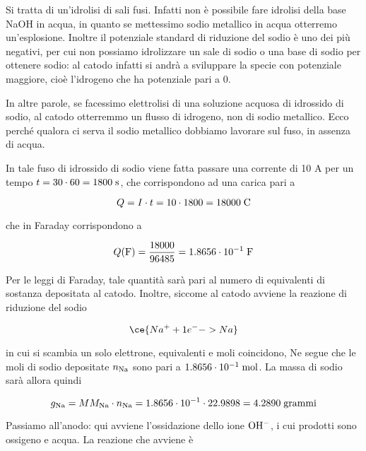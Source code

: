 \vspace{0.2cm}Si tratta di un'idrolisi di sali fusi. Infatti non è possibile fare idrolisi della base NaOH in acqua, in quanto se mettessimo sodio metallico in acqua otterremo un'esplosione. Inoltre il potenziale standard di riduzione del sodio è uno dei più negativi, per cui non possiamo idrolizzare un sale di sodio o una base di sodio per ottenere sodio: al catodo infatti si andrà a sviluppare la specie con potenziale maggiore, cioè l'idrogeno che ha potenziale pari a 0.

In altre parole, se facessimo elettrolisi di una soluzione acquosa di idrossido di sodio, al catodo otterremmo un flusso di idrogeno, non di sodio metallico. Ecco perché qualora ci serva il sodio metallico dobbiamo lavorare sul fuso, in assenza di acqua.

\vspace{0.2cm}In tale fuso di idrossido di sodio viene fatta passare una corrente di 10 A per un tempo $t=30 \cdot 60=1800 \; \rm s$, che corrispondono ad una carica pari a

\begin{equation*}
    Q=I \cdot t=10 \cdot 1800=18000 \; \rm C
\end{equation*}

che in Faraday corrispondono a

\begin{equation*}
    Q(\rm F)=\frac{18000}{96485}=1.8656 \cdot 10^{-1} \; F
\end{equation*}

Per le leggi di Faraday, tale quantità sarà pari al numero di equivalenti di sostanza depositata al catodo. Inoltre, siccome al catodo avviene la reazione di riduzione del sodio

\begin{equation*}
    \ce{Na^+ + 1e^- -> Na}
\end{equation*}

in cui si scambia un solo elettrone, equivalenti e moli coincidono, Ne segue che le moli di sodio depositate $n_{\rm Na}$ sono pari a $1.8656 \cdot 10^{-1} \; \rm mol$. La massa di sodio sarà allora quindi

\begin{equation*}
    g_{\rm Na}=MM_{\rm Na} \cdot n_{\rm Na}
    =1.8656 \cdot 10^{-1} \cdot 22.9898
    =4.2890 \; \rm grammi
\end{equation*}

Passiamo all'anodo: qui avviene l'ossidazione dello ione $\rm OH^-$, i cui prodotti sono ossigeno e acqua. La reazione che avviene è

